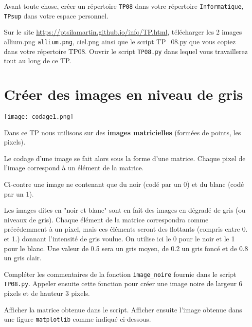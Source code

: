 Avant toute chose, créer un répertoire \lstinline{TP08} dans votre répertoire \lstinline{Informatique}, \lstinline{TPsup} dans votre espace personnel.

Sur le site \url{https://ptsilamartin.github.io/info/TP.html}, télécharger les 2  images \href{https://ptsilamartin.github.io/info/TP/allium.png}{allium.png}
\lstinline{allium.png}, \href{https://ptsilamartin.github.io/info/TP/ciel.png}{ciel.png} ainsi que le script \href{https://ptsilamartin.github.io/info/TP/TP_08.py}{TP\_08.py}  que vous copiez dans votre répertoire TP08. Ouvrir le script \lstinline{TP08.py} dans lequel vous travaillerez tout au long de ce TP.

\section*{Créer des images en niveau de gris}



\begin{marginfigure}
\texttt{[image: codage1.png]}
\end{marginfigure}
Dans ce TP nous utilisons sur des \textbf{images matricielles} (formées de points, les pixels). 

Le codage d'une image se fait alors sous la forme d'une matrice. Chaque pixel de l'image correspond à un élément de la matrice.

Ci-contre une image ne contenant que du noir (codé par un 0) et du blanc (codé par un 1).


Les images dites en "noir et blanc" sont en fait des images en dégradé de gris (ou niveaux de gris). Chaque élément de la matrice correspondra comme précédemment à un pixel, mais ces éléments seront des flottants (compris entre 0. et 1.) donnant l'intensité de gris voulue. On utilise ici le 0 pour le noir et le 1 pour le blanc. Une valeur de 0.5 sera un gris moyen, de 0.2 un gris foncé et de 0.8 un gris clair.

\begin{question}
Compléter les commentaires de la fonction \lstinline{image_noire} fournie dans le script \lstinline{TP08.py}. Appeler ensuite cette fonction pour créer une image noire de largeur 6 pixels et de hauteur 3 pixels.
\end{question}

\begin{question}
Afficher la matrice obtenue dans le script. Afficher ensuite  l'image obtenue dans une figure \lstinline{matplotlib} comme indiqué ci-dessous.
\end{question}

